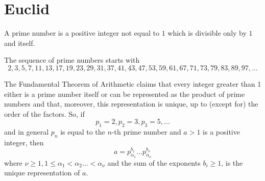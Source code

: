 
\section{Euclid}

A prime number is a positive integer not equal to $1$ which is divisible only by $1$ and itself.\newline

The sequence of prime numbers starts with
$$2,3,5,7,11,13,17,19,23,29,31,37,41,43,47,53,59,61,67,71,73,79,83,89,97, \ldots$$

The Fundamental Theorem of Arithmetic claims that every integer greater than 1 either is a prime number itself or can be
represented as the product of prime numbers and that, moreover, this representation is unique, up to (except for) the
order of the factors. So, if
$$p_1=2, p_2=3, p_3=5, \ldots$$
and in general $p_n$ is equal to the $n$-th prime number and $a>1$ is a positive integer, then
$$a=p_{\alpha_1}^{b_1} \ldots p_{\alpha_\nu}^{b_\nu}$$
where $\nu \geq 1, 1 \leq \alpha_1 < \alpha_2 \ldots < \alpha_\nu$ and the sum of the exponents $b_i \geq 1$, is the
unique representation of $a$.


